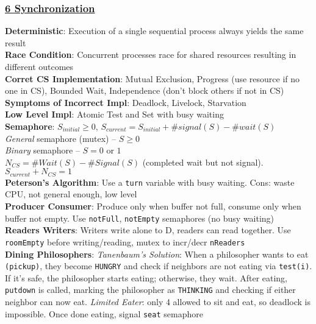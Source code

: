 \documentclass{article}
\begin{document}
\titlespacing*{\subsubsection}{0pt}{1pt}{1pt}

\pagestyle{fancy}
\fancyhf{}
\renewcommand{\headrulewidth}{0pt}

\setlength{\columnseprule}{0.2pt}

\singlespacing

{\footnotesize

\begin{multicols*}{3}

\subsubsection*{\underline{6 Synchronization}}
\textbf{Deterministic}: Execution of a single sequential process always yields the same result\\  
\textbf{Race Condition}: Concurrent processes race for shared resources resulting in different outcomes\\
\textbf{Corret CS Implementation}: Mutual Exclusion, Progress (use resource if no one in CS), Bounded Wait, Independence (don't block others if not in CS) \\
\textbf{Symptoms of Incorrect Impl}: Deadlock, Livelock, Starvation\\
\textbf{Low Level Impl}: Atomic Test and Set with busy waiting\\
\textbf{Semaphore}: $S_{initial}\geq 0$, $S_{current}=S_{initial}+\#signal(S)-\#wait(S)$\\
\textit{General} semaphore (mutex) – $S\geq 0$ \\
\textit{Binary} semaphore – $S=0$ or $1$ \\
$N_{CS}=\#Wait(S)-\#Signal(S)$ (completed wait but not signal). 
 $S_{current}+N_{CS}=1$\\
\textbf{Peterson's Algorithm}: Use a \texttt{turn} variable with busy waiting. Cons: waste CPU, not general enough, low level\\
\textbf{Producer Consumer}: Produce only when buffer not full, consume only when buffer not empty. Use \texttt{notFull}, \texttt{notEmpty} semaphores (no busy waiting) \\
\textbf{Readers Writers}: Writers write alone to D, readers can read together. Use \texttt{roomEmpty} before writing/reading, mutex to incr/decr \texttt{nReaders} \\
\textbf{Dining Philosophers}: \textit{Tanenbaum's Solution}: When a philosopher wants to eat \texttt{(pickup)}, they become \texttt{HUNGRY} and check if neighbors are not eating via \texttt{test(i)}. If it's safe, the philosopher starts eating; otherwise, they wait. After eating, \texttt{putdown} is called, marking the philosopher as \texttt{THINKING} and checking if either neighbor can now eat. \textit{Limited Eater}: only 4 allowed to sit and eat, so deadlock is impossible. Once done eating, signal \texttt{seat} semaphore

\end{multicols*}}
\end{document}

